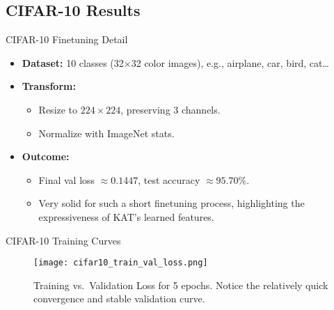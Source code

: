 \documentclass{beamer}
\begin{document}
\subsection{CIFAR-10 Results}
\begin{frame}{CIFAR-10 Finetuning Detail}
    \begin{itemize}
        \item \textbf{Dataset:} 10 classes (32$\times$32 color images), e.g., airplane, car, bird, cat\ldots
        \item \textbf{Transform:}
              \begin{itemize}
                  \item Resize to $224\times 224$, preserving 3 channels.
                  \item Normalize with ImageNet stats.
              \end{itemize}
        \item \textbf{Outcome:}
              \begin{itemize}
                  \item Final val loss $\approx 0.1447$, test accuracy $\approx 95.70\%$.
                  \item Very solid for such a short finetuning process, highlighting the expressiveness of KAT's learned features.
              \end{itemize}
    \end{itemize}
\end{frame}

\begin{frame}{CIFAR-10 Training Curves}
    \begin{figure}[h]
        \centering
        \texttt{[image: cifar10\_train\_val\_loss.png]}
        \caption{Training vs.\ Validation Loss for 5 epochs. Notice the relatively quick convergence and stable validation curve.}
    \end{figure}
\end{frame}
\end{document}
